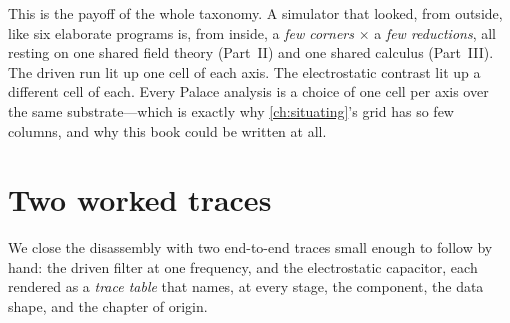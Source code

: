 This is the payoff of the whole taxonomy. A simulator that looked, from outside, like
six elaborate programs is, from inside, a \emph{few corners} $\times$ a \emph{few
reductions}, all resting on one shared field theory (Part~II) and one shared
calculus (Part~III). The driven run lit up one cell of each axis. The electrostatic
contrast lit up a different cell of each. Every Palace analysis is a choice of one
cell per axis over the same substrate---which is exactly why
\cref{ch:situating}'s grid has so few columns, and why this book could be written
at all.

\section{Two worked traces}
\label{sec:trace-worked}

We close the disassembly with two end-to-end traces small enough to follow by hand:
the driven filter at one frequency, and the electrostatic capacitor, each rendered
as a \emph{trace table} that names, at every stage, the component, the data shape,
and the chapter of origin.

